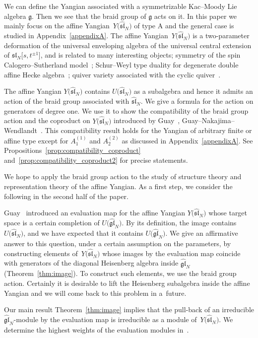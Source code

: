 \documentclass[10pt,a4paper]{amsart}
\theoremstyle{definition}
\numberwithin{equation}{section}
\newcommand{\affY}{Y\big(\affsl\big)}
\newcommand{\frakg}{\mathfrak{g}}
\newcommand{\gl}{\mathfrak{gl}}
\newcommand{\affsl}{\hat{\mathfrak{sl}}_N}
\begin{document}
We can define the Yangian associated with a symmetrizable Kac--Moody Lie algebra $\frakg$. Then we see that the braid group of $\frakg$ acts on it. In this paper we mainly focus on the affine Yangian~$\affY$ of type A and the general case is studied in Appendix~\ref{appendixA}. The affine Yangian~$\affY$ is a two-parameter deformation of the universal enveloping algebra of the universal central extension of $\mathfrak{sl}_N\big[s,t^{\pm 1}\big]$, and is related to many interesting objects; symmetry of the spin Calogero--Sutherland model~\cite{MR3898327, MR1724950}; Schur--Weyl type duality for degenerate double affine Hecke algebra~\cite{MR2199856}; quiver variety associated with the cyclic quiver~\cite{MR3898327, MR1818101}.

The affine Yangian $\affY$ contains $U\big(\affsl\big)$ as a subalgebra and hence it admits an action of the braid group associated with $\affsl$. We give a formula for the action on generators of degree one. We use it to show the compatibility of the braid group action and the coproduct on $\affY$ introduced by Guay~\cite{MR2323534}, Guay--Nakajima--Wendlandt~\cite{MR3861718}. This compatibility result holds for the Yangian of arbitrary finite or affine type except for $A_1^{(1)}$ and $A_2^{(2)}$ as discussed in Appendix~\ref{appendixA}. See Propositions~\ref{prop:compatibility_coproduct} and~\ref{prop:compatibility_coproduct2} for precise statements.

We hope to apply the braid group action to the study of structure theory and representation theory of the affine Yangian. As a first step, we consider the following in the second half of the paper.

Guay~\cite{MR2323534} introduced an evaluation map for the affine Yangian $\affY$ whose target space is a certain completion of $U\big(\hat{\gl}_N\big)$. By its definition, the image contains~$U\big(\affsl\big)$, and we have expected that it contains $U\big(\hat{\gl}_N\big)$. We give an affirmative answer to this question, under a certain assumption on the parameters, by constructing elements of~$\affY$ whose images by the evaluation map coincide with generators of the diagonal Heisenberg algebra inside $\hat{\gl}_N$ (Theorem~\ref{thm:image}). To construct such elements, we use the braid group action. Certainly it is desirable to lift the Heisenberg subalgebra inside the affine Yangian and we will come back to this problem in a~future.

Our main result Theorem~\ref{thm:image} implies that the pull-back of an irreducible $\hat{\gl}_N$-module by the evaluation map is irreducible as a module of~$\affY$. We determine the highest weights of the evaluation modules in~\cite{kodera_evaluation}.
\end{document}
